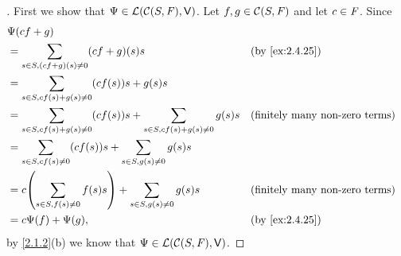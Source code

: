 \begin{proof}[]
  First we show that \(\Psi \in \mathcal{L}(\mathcal{C}(S, \mathit{F}), \mathsf{V})\).
  Let \(f, g \in \mathcal{C}(S, \mathit{F})\) and let \(c \in \mathit{F}\).
  Since
  \begin{align*}
     & \Psi(cf + g)                                                                                                                            \\
     & = \sum_{s \in S, (cf + g)(s) \neq 0} (cf + g)(s) s                                           &  & \by{ex:2.4.25}                        \\
     & = \sum_{s \in S, cf(s) + g(s) \neq 0} (cf(s)) s + g(s) s                                                                                \\
     & = \sum_{s \in S, cf(s) + g(s) \neq 0} (cf(s)) s + \sum_{s \in S, cf(s) + g(s) \neq 0} g(s) s &  & \text{(finitely many non-zero terms)} \\
     & = \sum_{s \in S, cf(s) \neq 0} (cf(s)) s + \sum_{s \in S, g(s) \neq 0} g(s) s                                                           \\
     & = c \pa{\sum_{s \in S, f(s) \neq 0} f(s) s} + \sum_{s \in S, g(s) \neq 0} g(s) s             &  & \text{(finitely many non-zero terms)} \\
     & = c \Psi(f) + \Psi(g),                                                                       &  & \by{ex:2.4.25}
  \end{align*}
  by \cref{2.1.2}(b) we know that \(\Psi \in \mathcal{L}(\mathcal{C}(S, \mathit{F}), \mathsf{V})\).


\end{proof}
